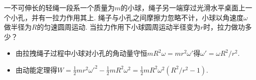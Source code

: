 \begin{problem}
    一不可伸长的轻绳一段系一个质量为$m$的小球，绳子另一端穿过光滑水平桌面上一个小孔，并有一拉力作用其上. 绳子与小孔之间摩擦力忽略不计，小球以角速度$\omega$做半径为$R$的匀速圆周运动. 当拉力作用下小球圆周运动半径变为$r$时，拉力做功多少？
\end{problem}
\begin{solution}\leavevmode
    \begin{itemize}
        \item 由拉拽绳子过程中小球对小孔的角动量守恒$mR^2\omega=mr^2\omega'$得$\omega'=\omega R^2/r^2$.
        \item 由动能定理得$W=\frac12mr^2\omega'^2-\frac12mR^2\omega^2=\frac12mR^2\omega^2(R^2/r^2-1)$.
    \end{itemize}
\end{solution}